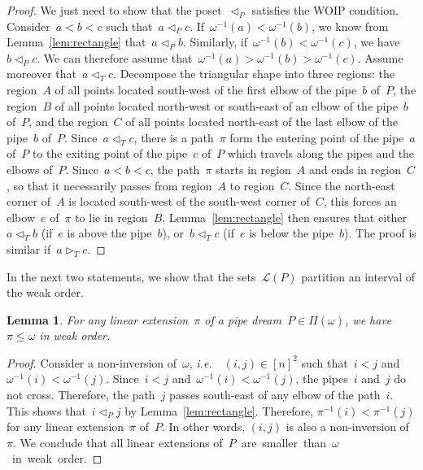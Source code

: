 \documentclass{amsart}
\newtheorem{lemma}[theorem]{Lemma}
\theoremstyle{definition}
\newcommand{\ie}{\textit{i.e.}~} %
\newcommand{\pipeDreams}{\Pi} %
\newcommand{\linearExtensions}{\mathcal{L}} %
\newcommand{\less}{\vartriangleleft} %
\newcommand{\more}{\vartriangleright} %
\newcommand{\contactLess}[1]{\less_{#1}} %
\newcommand{\contactMore}[1]{\more_{#1}} %
\begin{document}
\begin{proof}
We just need to show that the poset~$\contactLess{P}$ satisfies the WOIP condition.
Consider~$a < b < c$ such that~$a \contactLess{P} c$. If~$\omega^{-1}(a) < \omega^{-1}(b)$, we know from Lemma~\ref{lem:rectangle} that~$a \contactLess{P} b$. Similarly, if~$\omega^{-1}(b) < \omega^{-1}(c)$, we have~$b \contactLess{P} c$. We can therefore assume that~$\omega^{-1}(a) > \omega^{-1}(b) > \omega^{-1}(c)$. Assume moreover that~$a \contactLess{T} c$. Decompose the triangular shape into three regions: the region~$A$ of all points located south-west of the first elbow of the pipe~$b$ of~$P$, the region~$B$ of all points located north-west or south-east of an elbow of the pipe~$b$ of~$P$, and the region~$C$ of all points located north-east of the last elbow of the pipe~$b$ of~$P$. Since~$a \contactLess{T} c$, there is a path~$\pi$ form the entering point of the pipe~$a$ of~$P$ to the exiting point of the pipe~$c$ of~$P$ which travels along the pipes and the elbows of~$P$. Since~$a < b < c$, the path~$\pi$ starts in region~$A$ and ends in region~$C$, so that it necessarily passes from region~$A$ to region~$C$. Since the north-east corner of~$A$ is located south-west of the south-west corner of~$C$, this forces an elbow~$e$ of~$\pi$ to lie in region~$B$. Lemma~\ref{lem:rectangle} then ensures that either~$a \contactLess{T} b$ (if~$e$ is above the pipe~$b$), or~$b \contactLess{T} c$ (if~$e$ is below the pipe~$b$). The proof is similar if~$a \contactMore{T} c$.
\end{proof}

In the next two statements, we show that the sets~$\linearExtensions(P)$ partition an interval of the weak order.

\begin{lemma}
\label{lem:interval}
For any linear extension~$\pi$ of a pipe dream~$P \in \pipeDreams(\omega)$, we have~$\pi \le \omega$ in weak order.
\end{lemma}

\begin{proof}
Consider a non-inversion of~$\omega$, \ie~$(i,j) \in [n]^2$ such that~$i < j$ and~$\omega^{-1}(i) < \omega^{-1}(j)$. Since~$i < j$ and~$\omega^{-1}(i) < \omega^{-1}(j)$, the pipes~$i$ and~$j$ do not cross. Therefore, the path~$j$ passes south-east of any elbow of the path~$i$. This shows that~$i \contactLess{P} j$ by Lemma~\ref{lem:rectangle}. Therefore, $\pi^{-1}(i) < \pi^{-1}(j)$ for any linear extension~$\pi$ of~$P$. In other words, $(i,j)$ is also a non-inversion of~$\pi$. We conclude that all linear extensions \mbox{of~$P$ are smaller than~$\omega$ in weak order}.
\end{proof}
\end{document}
